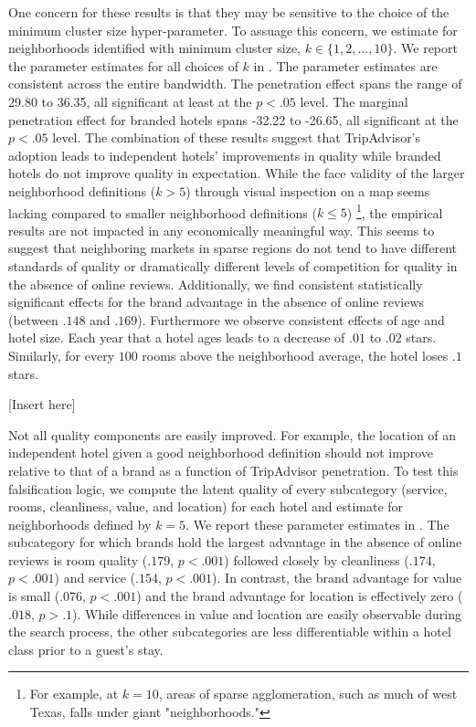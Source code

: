 \documentclass[12pt, leqno]{article}
\begin{document}
One concern for these results is that they may be sensitive to the choice of the minimum cluster size hyper-parameter. To assuage this concern, we estimate  for neighborhoods identified with minimum cluster size, $k\in\{1,2,...,10\}$. We report the parameter estimates for all choices of $k$ in . The parameter estimates are consistent across the entire bandwidth. The penetration effect spans the range of 29.80 to 36.35, all significant at least at the $p<.05$ level. The marginal penetration effect for branded hotels spans -32.22 to -26.65, all significant at the $p<.05$ level. The combination of these results suggest that TripAdvisor's adoption leads to independent hotels' improvements in quality while branded hotels do not improve quality in expectation. While the face validity of the larger neighborhood definitions ($k>5$) through visual inspection on a map seems lacking compared to smaller neighborhood definitions ($k\le 5$) \footnote{For example, at $k=10$, areas of sparse agglomeration, such as much of west Texas, falls under giant "neighborhoods."}, the empirical results are not impacted in any economically meaningful way. This seems to suggest that neighboring markets in sparse regions do not tend to have different standards of quality or dramatically different levels of competition for quality in the absence of online reviews. Additionally, we find consistent statistically significant effects for the brand advantage in the absence of online reviews (between $.148$ and $.169$). Furthermore we observe consistent effects of age and hotel size. Each year that a hotel ages leads to a decrease of $.01$ to $.02$ stars. Similarly, for every $100$ rooms above the neighborhood average, the hotel loses $.1$ stars.

[Insert  here]

Not all quality components are easily improved. For example, the location of an independent hotel given a good neighborhood definition should not improve relative to that of a brand as a function of TripAdvisor penetration. To test this falsification logic, we compute the latent quality of every subcategory (service, rooms, cleanliness, value, and location) for each hotel and estimate  for neighborhoods defined by $k=5$. We report these parameter estimates in . The subcategory for which brands hold the largest advantage in the absence of online reviews is room quality ($.179$, $p<.001$) followed closely by cleanliness ($.174$, $p<.001$) and service ($.154$, $p<.001$). In contrast, the brand advantage for value is small ($.076$, $p<.001$) and the brand advantage for location is effectively zero ($.018$, $p>.1$). While differences in value and location are easily observable during the search process, the other subcategories are less differentiable within a hotel class prior to a guest's stay. 
\end{document}

